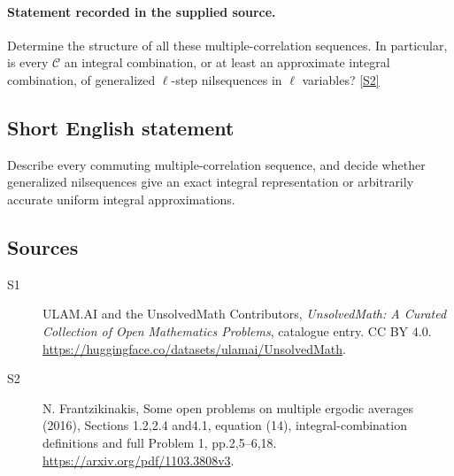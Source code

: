 \documentclass[11pt]{article}
\newcommand{\sref}[2]{\hyperlink{source:#1:#2}{[S#2]}}
\begin{document}
\paragraph{Statement recorded in the supplied source.}
Determine the structure of all these multiple-correlation sequences. In particular, is every $\mathcal C$ an integral combination, or at least an approximate integral combination, of generalized $\ell$-step nilsequences in $\ell$ variables? \sref{statement}{2}
\subsection{Short English statement}
Describe every commuting multiple-correlation sequence, and decide whether generalized nilsequences give an exact integral representation or arbitrarily accurate uniform integral approximations.
\subsection{Sources}
\begin{description}
\item[\hypertarget{source:statement:1}{S1}] ULAM.AI and the UnsolvedMath Contributors, \emph{UnsolvedMath: A Curated Collection of Open Mathematics Problems}, catalogue entry. CC BY 4.0. \url{https://huggingface.co/datasets/ulamai/UnsolvedMath}.
\item[\hypertarget{source:statement:2}{S2}] N. Frantzikinakis, Some open problems on multiple ergodic averages (2016), Sections 1.2,2.4 and4.1, equation (14), integral-combination definitions and full Problem 1, pp.2,5--6,18. \url{https://arxiv.org/pdf/1103.3808v3}.
\end{description}
\label{end:statement}
\end{document}

